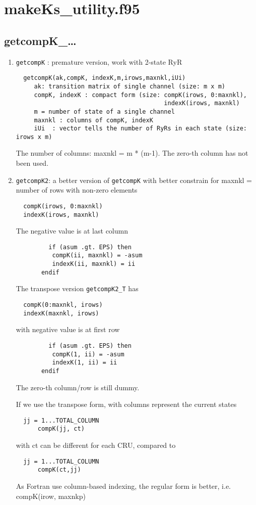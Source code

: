\chapter{makeKs\_utility.f95}
\label{chap:makeKs_util}

\section{getcompK\_\ldots}
\label{sec:getcompK}

\begin{enumerate}
  \item \verb!getcompK! : premature version, work with 2-state RyR
  \begin{lstlisting}
  getcompK(ak,compK, indexK,m,irows,maxnkl,iUi)
     ak: transition matrix of single channel (size: m x m)
     compK, indexK : compact form (size: compK(irows, 0:maxnkl), 
                                         indexK(irows, maxnkl)
     m = number of state of a single channel
     maxnkl : columns of compK, indexK
     iUi  : vector tells the number of RyRs in each state (size: irows x m)
  \end{lstlisting}
  The number of columns: maxnkl = m * (m-1). The zero-th column has not been
  used.
  
  \item \verb!getcompK2!: a better version of \verb!getcompK! with better
  constrain for maxnkl = number of rows with non-zero elements
  \begin{lstlisting}
  compK(irows, 0:maxnkl)
  indexK(irows, maxnkl)
  \end{lstlisting}
  The negative value is at last column
  \begin{verbatim}
         if (asum .gt. EPS) then
          compK(ii, maxnkl) = -asum
          indexK(ii, maxnkl) = ii
       endif
  \end{verbatim}
  
  The transpose version \verb!getcompK2_T! has
  \begin{lstlisting}
  compK(0:maxnkl, irows)
  indexK(maxnkl, irows)
  \end{lstlisting}
  with negative value is at first row
  \begin{verbatim}
         if (asum .gt. EPS) then
          compK(1, ii) = -asum
          indexK(1, ii) = ii
       endif
  \end{verbatim}  
  The zero-th column/row is still dummy. 
  
  \begin{framed}
  If we use the transpose form, with columns represent the current states
  \begin{verbatim}
  jj = 1...TOTAL_COLUMN
      compK(jj, ct)
  \end{verbatim}
  with ct can be different for each CRU, compared to
  \begin{verbatim}
  jj = 1...TOTAL_COLUMN
      compK(ct,jj)
  \end{verbatim}
  As Fortran use column-based indexing, the regular form is better, i.e.
  compK(irow, maxnkp)
  \end{framed}
  

\end{enumerate}
